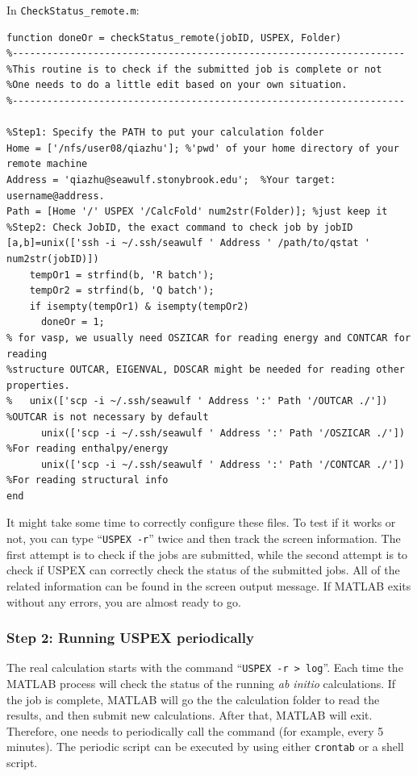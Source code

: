\documentclass[12pt]{article}
\newcommand{\file}[1]{\texttt{#1}}
\begin{document}
\newpage
In \file{CheckStatus\_remote.m}:

\begin{lstlisting}
function doneOr = checkStatus_remote(jobID, USPEX, Folder)
%--------------------------------------------------------------------
%This routine is to check if the submitted job is complete or not
%One needs to do a little edit based on your own situation.
%--------------------------------------------------------------------

%Step1: Specify the PATH to put your calculation folder
Home = ['/nfs/user08/qiazhu']; %'pwd' of your home directory of your remote machine
Address = 'qiazhu@seawulf.stonybrook.edu';  %Your target: username@address.
Path = [Home '/' USPEX '/CalcFold' num2str(Folder)]; %just keep it
%Step2: Check JobID, the exact command to check job by jobID
[a,b]=unix(['ssh -i ~/.ssh/seawulf ' Address ' /path/to/qstat ' num2str(jobID)])
    tempOr1 = strfind(b, 'R batch');
    tempOr2 = strfind(b, 'Q batch');
    if isempty(tempOr1) & isempty(tempOr2)
      doneOr = 1;
% for vasp, we usually need OSZICAR for reading energy and CONTCAR for reading 
%structure OUTCAR, EIGENVAL, DOSCAR might be needed for reading other properties.
%   unix(['scp -i ~/.ssh/seawulf ' Address ':' Path '/OUTCAR ./']) 
%OUTCAR is not necessary by default
      unix(['scp -i ~/.ssh/seawulf ' Address ':' Path '/OSZICAR ./']) 
%For reading enthalpy/energy
      unix(['scp -i ~/.ssh/seawulf ' Address ':' Path '/CONTCAR ./']) 
%For reading structural info
end
\end{lstlisting}

It might take some time to correctly configure these files. To test if it works
or not, you can type ``\texttt{USPEX -r}'' twice and then track the
screen information. The first attempt is to check if the jobs are submitted,
while the second attempt is to check if USPEX can correctly check the status of
the submitted jobs. All of the related information can be found in the screen
output message. If MATLAB exits without any errors, you are almost ready to go.

\subsubsection{Step 2: Running USPEX periodically}

The real calculation starts with the command ``\texttt{USPEX -r > log}''. Each
time the MATLAB process will check the status of the running \emph{ab initio}
calculations. If the job is complete, MATLAB will go the the calculation folder
to read the results, and then submit new calculations. After that, MATLAB will
exit. Therefore, one needs to periodically call the command (for example, every
5 minutes). The periodic script can be executed by using either \texttt{crontab}
or a shell script.
\end{document}
